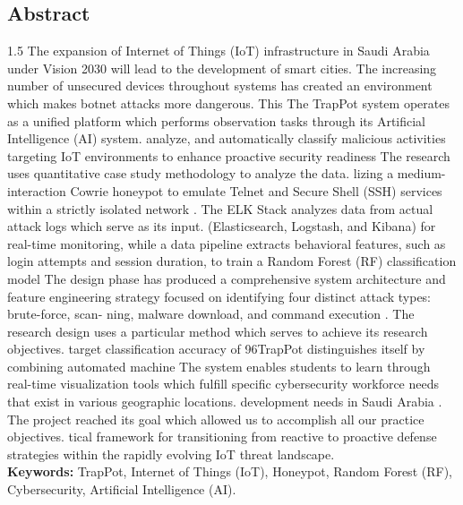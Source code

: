 \begin{center}
  \section*{Abstract}
\end{center}


\begin{spacing}{1.5}
The expansion of Internet of Things (IoT) infrastructure in Saudi Arabia under Vision 2030 will lead to the development of smart cities.
The increasing number of unsecured devices throughout systems has created an environment which makes botnet attacks more dangerous. This
The TrapPot system operates as a unified platform which performs observation tasks through its Artificial Intelligence (AI) system.
analyze, and automatically classify malicious activities targeting IoT environments to enhance
proactive security readiness The research uses quantitative case study methodology to analyze the data.
lizing a medium-interaction Cowrie honeypot to emulate Telnet and Secure Shell (SSH) services
within a strictly isolated network . The ELK Stack analyzes data from actual attack logs which serve as its input.
(Elasticsearch, Logstash, and Kibana) for real-time monitoring, while a data pipeline extracts
behavioral features, such as login attempts and session duration, to train a Random Forest (RF)
classification model The design phase has produced a comprehensive system architecture and
feature engineering strategy focused on identifying four distinct attack types: brute-force, scan-
ning, malware download, and command execution . The research design uses a particular method which serves to achieve its research objectives.
target classification accuracy of 96TrapPot distinguishes itself by combining automated machine
The system enables students to learn through real-time visualization tools which fulfill specific cybersecurity workforce needs that exist in various geographic locations.
development needs in Saudi Arabia . The project reached its goal which allowed us to accomplish all our practice objectives.
tical framework for transitioning from reactive to proactive defense strategies within the rapidly
evolving IoT threat landscape.\\

  {\bf Keywords:} TrapPot, Internet of Things (IoT), Honeypot, Random Forest (RF), Cybersecurity, Artificial Intelligence (AI).
\end{spacing}
\clearpage
